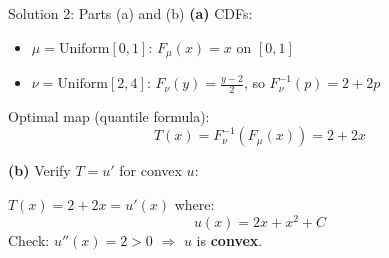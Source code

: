\documentclass[aspectratio=169]{beamer}
\begin{document}
\begin{frame}{Solution 2: Parts (a) and (b)}
\textbf{(a)} CDFs:
\begin{itemize}
    \item $\mu = \text{Uniform}[0,1]$: $F_\mu(x) = x$ on $[0,1]$
    \item $\nu = \text{Uniform}[2,4]$: $F_\nu(y) = \frac{y-2}{2}$, so $F_\nu^{-1}(p) = 2 + 2p$
\end{itemize}

\vspace{0.2cm}
Optimal map (quantile formula):
\[
\boxed{T(x) = F_\nu^{-1}(F_\mu(x)) = 2 + 2x}
\]

\vspace{0.4cm}
\textbf{(b)} Verify $T = u'$ for convex $u$:

$T(x) = 2 + 2x = u'(x)$ where:
\[
u(x) = 2x + x^2 + C
\]
Check: $u''(x) = 2 > 0$ $\Rightarrow$ $u$ is \textbf{convex}. \checkmark
\end{frame}
\end{document}
